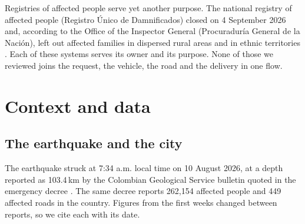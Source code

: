 \documentclass[11pt]{article}
\begin{document}
Registries of affected people serve yet another purpose. The national registry of affected people (Registro Único de Damnificados) closed on 4 September 2026 and, according to the Office of the Inspector General (Procuraduría General de la Nación), left out affected families in dispersed rural areas and in ethnic territories \citep{vanguardia2026procuraduria}. Each of these systems serves its owner and its purpose. None of those we reviewed joins the request, the vehicle, the road and the delivery in one flow.

\section{Context and data}\label{sec:context}

\subsection{The earthquake and the city}

The earthquake struck at 7:34 a.m. local time on 10 August 2026, at a depth reported as 103.4\,km by the Colombian Geological Service bulletin quoted in the emergency decree \citep{decreto2026emergencia}. The same decree reports 262,154 affected people and 449 affected roads in the country. Figures from the first weeks changed between reports, so we cite each with its date. %
\end{document}
